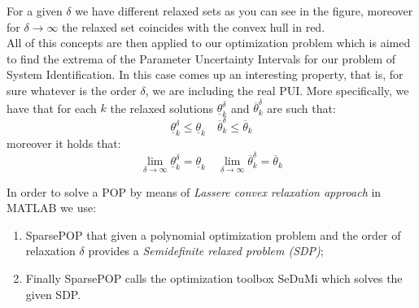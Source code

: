 For a given $\delta$ we have different relaxed sets as you can see in the figure, moreover for $\delta\to\infty$ the relaxed set coincides with the convex hull in red.\\
All of this concepts are then applied to our optimization problem which is aimed to find the extrema of the Parameter Uncertainty Intervals for our problem of System Identification. In this case comes up an interesting property, that is, for sure whatever is the order $\delta$, we are including the real PUI. More specifically, we have that for each $k$ the relaxed solutions $\underline{\theta}_k^{\delta}$ and $\overline{\theta}_k^{\delta}$ are such that:
{\large{
    \begin{equation}
        \underline{\theta}_k^{\delta} \le \underline{\theta}_k
        \quad 
        \overline{\theta}_k^{\delta} \le \overline{\theta}_k
    \end{equation}
}}
moreover it holds that: 
\begin{equation}
    \lim_{\delta\to\infty} \underline{\theta}_k^{\delta} = \underline{\theta}_k \quad
    \lim_{\delta\to\infty} \overline{\theta}_k^{\delta} = \overline{\theta}_k
\end{equation}

\noindent
In order to solve a POP by means of \textit{Lassere convex  relaxation approach} in MATLAB we use:
\begin{enumerate}
    \item \textsf{SparsePOP} that given a polynomial optimization problem and the order of relaxation $\delta$ provides a \textit{Semidefinite relaxed problem (SDP)};
    \item Finally \textsf{SparsePOP} calls the optimization toolbox \textsf{SeDuMi} which solves  the given SDP. 
\end{enumerate}

